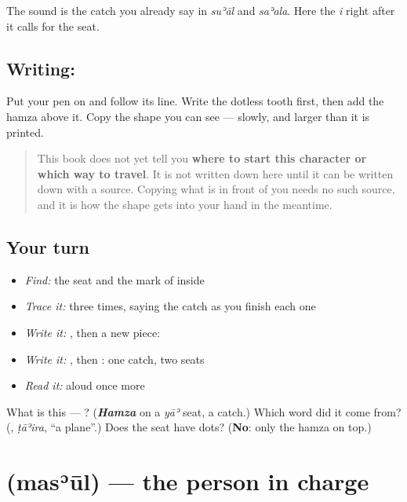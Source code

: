 The sound is the catch you already say in \emph{suʾāl} and \emph{saʾala}. Here the \emph{i} right after it calls for the \textbf{} seat.

\subsection*{Writing: }
Put your pen on  and follow its line. Write the dotless tooth first, then add the hamza above it. Copy the shape you can see — slowly, and larger than it is printed.

\begin{quote}
This book does not yet tell you \textbf{where to start this character or which way to travel}. It is not written down here until it can be written down with a source. Copying what is in front of you needs no such source, and it is how the shape gets into your hand in the meantime.
\end{quote}

\subsection*{Your turn}
\begin{itemize}
\raggedright
  \item \emph{Find:} the seat and the mark of  inside \textbf{}
  \item \emph{Trace it:}  three times, saying the catch as you finish each one
  \item \emph{Write it:} , then a new piece: 
  \item \emph{Write it:} \textbf{}, then \textbf{}: one catch, two seats
  \item \emph{Read it:} \textbf{} aloud once more
\end{itemize}

\begin{tcolorbox}[breakable,colback=teal!4,colframe=teal!35!black,title={Before you move on}]
What is this — ? (\emph{\textbf{Hamza}} on a \emph{yāʾ} seat, a catch.) Which word did it come from? (\textbf{}, \emph{ṭāʾira}, \textquotedblleft{}a plane\textquotedblright{}.) Does the seat have dots? (\textbf{No}: only the hamza on top.)
\end{tcolorbox}
\section[\texorpdfstring{\ar{مسؤول} (masʾūl)}{مسؤول (masʾūl)}]{ (masʾūl) — the person in charge}

